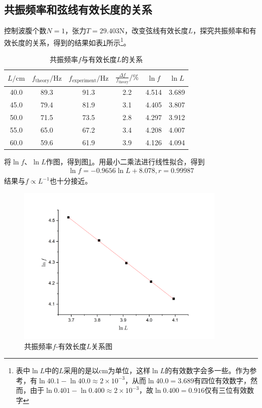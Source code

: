 \documentclass{ctexart}
\begin{document}
	\subsection{共振频率和弦线有效长度的关系}
	控制波腹个数$N=1$，张力$T=29.403\mathrm{N}$，改变弦线有效长度$L$，探究共振频率和有效长度的关系，得到的结果如表\ref{tab:f-L}所示\footnote{表中$\ln{L}$中的$L$采用的是以$\mathrm{cm}$为单位，这样$\ln{L}$的有效数字会多一些。作为参考，有$\ln{40.1}-\ln{40.0}\approx 2\times10^{-3}$，从而$\ln{40.0}=3.689$有四位有效数字，然而，由于$\ln{0.401}-\ln{0.400}\approx 2\times 10^{-3}$，故$\ln{0.400}=0.916$仅有三位有效数字}。
	\begin{table}[H]
		\begin{center}
			\caption{共振频率$f$与有效长度$L$的关系}
			\begin{tabular}{cccccc}
				\toprule
				$L/\mathrm{cm}$&$f_\text{theory}/\mathrm{Hz}$&$f_\text{experiment}/\mathrm{Hz}$&$\frac{\Delta f}{f_\text{theory}}/\%$&$\ln{f}$&$\ln{L}$\\
				\midrule
				40.0&89.3&91.3&2.2&4.514&3.689\\
				45.0&79.4&81.9&3.1&4.405&3.807\\
				50.0&71.5&73.5&2.8&4.297&3.912\\
				55.0&65.0&67.2&3.4&4.208&4.007\\
				60.0&59.6&61.9&3.9&4.126&4.094\\
				\bottomrule
			\end{tabular}
			\label{tab:f-L}
		\end{center}
	\end{table}
	将$\ln{f}$、$\ln{L}$作图，得到图\ref{fig:f-L}。用最小二乘法进行线性拟合，得到
	\begin{align}
		\ln{f}=-0.9656\ln{L}+8.078,r=0.99987
	\end{align}
	结果与$f\propto L^{-1}$也十分接近。
	\begin{figure}[H]
		\centering
		\includegraphics[width=10cm]{fL.png}
		\caption{共振频率$f$-有效长度$L$关系图}
		\label{fig:f-L}
	\end{figure}
\end{document}
